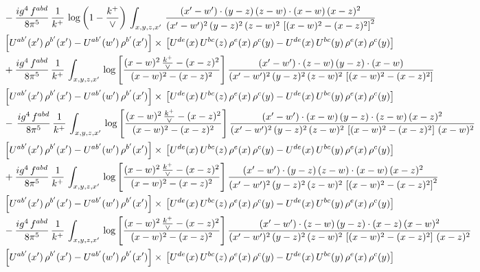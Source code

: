 \documentclass[10pt]{article}
\numberwithin{equation}{section}
\begin{document}
\begin{align}
&   - \frac{ig^{4}\, f^{abd}}{8\pi^{5}}\, \frac{1}{k^{+}}\,\log{\left(1-\frac{k^{+}}{\vee}\right)}\, \int_{x,y,z,x'}\,\frac{(x'-w')\cdot  (y-z)\, (z-w)\cdot (x-w)\, (x-z)^{2}}{(x'-w')^{2}\, (y-z)^{2}\, (z-w)^{2}\,\left[(x-w)^{2}-(x-z)^{2}\right]^{2}}\, \notag \\ & \left[U^{ab'}(x')\,\rho^{b'}(x')-U^{ab'}(w')\, \rho^{b'}(x')\right]\times\,\left[U^{de}(x)\,U^{bc}(z)\, \rho^{e}(x)\,\rho^{c}(y)-U^{de}(x)\,U^{bc}(y)\,\rho^{e}(x)\,\rho^{c}(y)\right] \notag \\
&  + \frac{ig^{4}\, f^{abd}}{8\pi^{5}}\, \frac{1}{k^{+}}\, \int_{x,y,z,x'}\,\log{\left[\frac{(x-w)^{2}\,\frac{k^{+}}{\vee}-(x-z)^{2}}{(x-w)^{2}-(x-z)^{2}}\right]}\,\frac{(x'-w')\cdot (z-w)\, (y-z)\cdot (x-w)}{(x'-w')^{2}\, (y-z)^{2}\, (z-w)^{2}\,\left[(x-w)^{2}-(x-z)^{2}\right]}\, \notag \\ & \left[U^{ab'}(x')\,\rho^{b'}(x')-U^{ab'}(w')\, \rho^{b'}(x')\right]\times\,\left[U^{de}(x)\,U^{bc}(z)\, \rho^{e}(x)\,\rho^{c}(y)-U^{de}(x)\,U^{bc}(y)\,\rho^{e}(x)\,\rho^{c}(y)\right] \notag \\
& -\,\frac{ig^{4}\, f^{abd}}{8\pi^{5}}\, \frac{1}{k^{+}}\, \int_{x,y,z,x'}\,\log{\left[\frac{(x-w)^{2}\,\frac{k^{+}}{\vee}-(x-z)^{2}}{(x-w)^{2}-(x-z)^{2}}\right]}\,\frac{(x'-w')\cdot (x-w)\, (y-z)\cdot(z-w)\,(x-z)^{2}}{(x'-w')^{2}\, (y-z)^{2}\, (z-w)^{2}\,\left[(x-w)^{2}-(x-z)^{2}\right]\,(x-w)^{2}}\, \notag \\ & \left[U^{ab'}(x')\,\rho^{b'}(x')-U^{ab'}(w')\, \rho^{b'}(x')\right]\times\,\left[U^{de}(x)\,U^{bc}(z)\, \rho^{e}(x)\,\rho^{c}(y)-U^{de}(x)\,U^{bc}(y)\,\rho^{e}(x)\,\rho^{c}(y)\right] \notag \\
& +\frac{ig^{4}\, f^{abd}}{8\pi^{5}}\, \frac{1}{k^{+}}\, \int_{x,y,z,x'}\,\log{\left[\frac{(x-w)^{2}\,\frac{k^{+}}{\vee}-(x-z)^{2}}{(x-w)^{2}-(x-z)^{2}}\right]}\,\frac{(x'-w')\cdot  (y-z)\, (z-w)\cdot (x-w)\, (x-z)^{2}}{(x'-w')^{2}\, (y-z)^{2}\, (z-w)^{2}\,\left[(x-w)^{2}-(x-z)^{2}\right]^{2}}\, \notag \\ & \left[U^{ab'}(x')\,\rho^{b'}(x')-U^{ab'}(w')\, \rho^{b'}(x')\right]\times\,\left[U^{de}(x)\,U^{bc}(z)\, \rho^{e}(x)\,\rho^{c}(y)-U^{de}(x)\,U^{bc}(y)\,\rho^{e}(x)\,\rho^{c}(y)\right] \notag \\
& - \frac{ig^{4}\, f^{abd}}{8\pi^{5}}\, \frac{1}{k^{+}}\, \int_{x,y,z,x'}\,\log{\left[\frac{(x-w)^{2}\,\frac{k^{+}}{\vee}-(x-z)^{2}}{(x-w)^{2}-(x-z)^{2}}\right]}\,\frac{(x'-w')\cdot (z-w)\, (y-z)\cdot (x-z)\, (x-w)^{2}}{(x'-w')^{2}\, (y-z)^{2}\, (z-w)^{2}\,\left[(x-w)^{2} - (x-z)^{2}\right]\, (x-z)^{2}}\, \notag \\ & \left[U^{ab'}(x')\,\rho^{b'}(x')-U^{ab'}(w')\, \rho^{b'}(x')\right]\times\,\left[U^{de}(x)\,U^{bc}(z)\, \rho^{e}(x)\,\rho^{c}(y)-U^{de}(x)\,U^{bc}(y)\,\rho^{e}(x)\,\rho^{c}(y)\right] \notag \\

\end{align}
\end{document}
